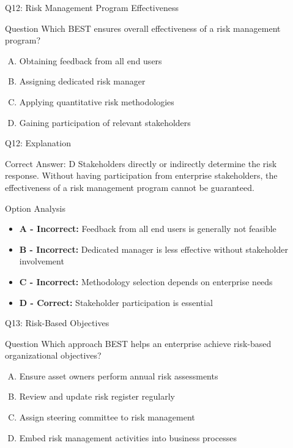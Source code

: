 \documentclass{beamer}
\begin{document}
	\begin{frame}{Q12: Risk Management Program Effectiveness}
		\begin{block}{Question}
			Which BEST ensures overall effectiveness of a risk management program?
		\end{block}
		\begin{enumerate}[(A)]
			\item Obtaining feedback from all end users
			\item Assigning dedicated risk manager
			\item Applying quantitative risk methodologies
			\item Gaining participation of relevant stakeholders
		\end{enumerate}
	\end{frame}
	
	\begin{frame}{Q12: Explanation}
		\begin{block}{Correct Answer: D}
			Stakeholders directly or indirectly determine the risk response. Without having participation from enterprise stakeholders, the effectiveness of a risk management program cannot be guaranteed.
		\end{block}
		\begin{block}{Option Analysis}
			\begin{itemize}
				\item \textbf{A - Incorrect:} Feedback from all end users is generally not feasible
				\item \textbf{B - Incorrect:} Dedicated manager is less effective without stakeholder involvement
				\item \textbf{C - Incorrect:} Methodology selection depends on enterprise needs
				\item \textbf{D - Correct:} Stakeholder participation is essential
			\end{itemize}
		\end{block}
	\end{frame}
	
	\begin{frame}{Q13: Risk-Based Objectives}
		\begin{block}{Question}
			Which approach BEST helps an enterprise achieve risk-based organizational objectives?
		\end{block}
		\begin{enumerate}[(A)]
			\item Ensure asset owners perform annual risk assessments
			\item Review and update risk register regularly
			\item Assign steering committee to risk management
			\item Embed risk management activities into business processes
		\end{enumerate}
	\end{frame}
	
\end{document}
